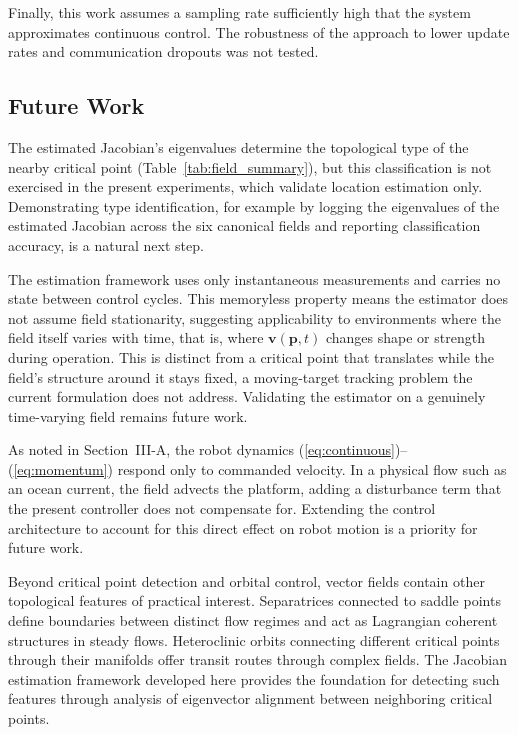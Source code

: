 \documentclass[lettersize,journal]{IEEEtran}
\begin{document}
Finally, this work assumes a sampling rate sufficiently high that the system approximates continuous control. The robustness of the approach to lower update rates and communication dropouts was not tested.

\subsection{Future Work}

The estimated Jacobian's eigenvalues determine the topological type of the nearby critical point (Table~\ref{tab:field_summary}), but this classification is not exercised in the present experiments, which validate location estimation only. Demonstrating type identification, for example by logging the eigenvalues of the estimated Jacobian across the six canonical fields and reporting classification accuracy, is a natural next step.

The estimation framework uses only instantaneous measurements and carries no state between control cycles. This memoryless property means the estimator does not assume field stationarity, suggesting applicability to environments where the field itself varies with time, that is, where $\mathbf{v}(\mathbf{p}, t)$ changes shape or strength during operation. This is distinct from a critical point that translates while the field's structure around it stays fixed, a moving-target tracking problem the current formulation does not address. Validating the estimator on a genuinely time-varying field remains future work.

As noted in Section~III-A, the robot dynamics (\ref{eq:continuous})--(\ref{eq:momentum}) respond only to commanded velocity. In a physical flow such as an ocean current, the field advects the platform, adding a disturbance term that the present controller does not compensate for. Extending the control architecture to account for this direct effect on robot motion is a priority for future work.

Beyond critical point detection and orbital control, vector fields contain other topological features of practical interest. Separatrices connected to saddle points define boundaries between distinct flow regimes and act as Lagrangian coherent structures in steady flows. Heteroclinic orbits connecting different critical points through their manifolds offer transit routes through complex fields. The Jacobian estimation framework developed here provides the foundation for detecting such features through analysis of eigenvector alignment between neighboring critical points.
\end{document}
